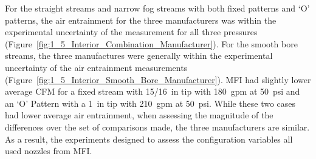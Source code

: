 \documentclass[12pt,oneside]{book}
\begin{document}
For the straight streams and narrow fog streams with both fixed patterns and `O' patterns, the air entrainment for the three manufacturers was within the experimental uncertainty of the measurement for all three pressures (Figure~\ref{fig:1_5_Interior_Combination_Manufacturer}). For the smooth bore streams, the three manufactures were generally within the experimental uncertainty of the air entrainment measurements (Figure~\ref{fig:1_5_Interior_Smooth_Bore_Manufacturer}). MFI had slightly lower average CFM for a fixed stream with 15/16~in tip with 180~gpm at 50~psi and an `O' Pattern with a 1~in tip with 210~gpm at 50~psi. While these two cases had lower average air entrainment, when assessing the magnitude of the differences over the set of comparisons made, the three manufacturers are similar. As a result, the experiments designed to assess the configuration variables all used nozzles from MFI. 
\clearpage





\end{document}
